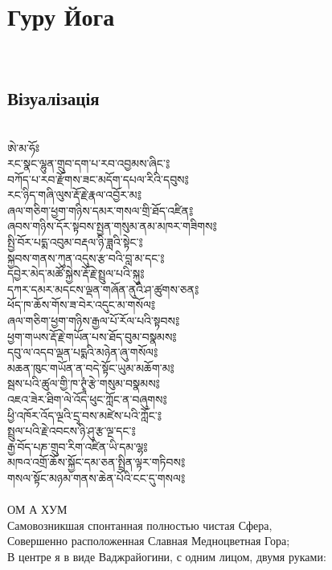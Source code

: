 \section{Гуру Йога}
\\
\subsection{Візуалізація}
\\
\ti
ཨེ་མ་ཧོཿ \\
རང་སྣང་ལྷུན་གྲུབ་དག་པ་རབ་འབྱམས་ཞིང་༔ \\
བཀོད་པ་རབ་རྫོགས་ཟང་མདོག་དཔལ་རིའི་དབུས༔\\
རང་ཉིད་གཞི་ལུས་རྡོ་རྗེ་རྣལ་འབྱོར་མ༔\\
ཞལ་གཅིག་ཕྱག་གཉིས་དམར་གསལ་གྲི་ཐོད་འཛིན༔\\
ཞབས་གཉིས་དོར་སྟབས་སྤྱན་གསུམ་ནམ་མཁར་གཟིགས༔\\
སྤྱི་བོར་པདྨ་འབུམ་བརྡལ་ཉི་ཟླའི་སྟེང་༔\\
སྐྱབས་གནས་ཀུན་འདུས་རྩ་བའི་བླ་མ་དང་༔\\
དབྱེར་མེད་མཚོ་སྐྱེས་རྡོ་རྗེ་སྤྲུལ་པའི་སྐུ༔\\
དཀར་དམར་མདངས་ལྡན་གཞོན་ནུའི་ཤ་ཚུགས་ཅན༔\\
ཕོད་ཁ་ཆོས་གོས་ཟ་བེར་འདུང་མ་གསོལ༔\\
ཞལ་གཅིག་ཕྱག་གཉིས་རྒྱལ་པོ་རོལ་པའི་སྟབས༔\\
ཕྱག་གཡས་རྡོ་རྗེ་གཡོན་པས་ཐོད་བུམ་བསྣམས༔\\
དབུ་ལ་འདབ་ལྡན་པདྨའི་མཉེན་ཞུ་གསོལ༔\\
མཆན་ཁུང་གཡོན་ན་བདེ་སྟོང་ཡུམ་མཆོག་མ༔\\
སྦས་པའི་ཚུལ་གྱི་ཁ་ཊྭཱཾ་རྩེ་གསུམ་བསྣམས༔\\
འཇའ་ཟེར་ཐིག་ལེ་འོད་ཕུང་ཀློང་ན་བཞུགས༔\\
ཕྱི་འཁོར་འོད་ལྔའི་དྲྭ་བས་མཛེས་པའི་ཀློང་༔\\
སྤྲུལ་པའི་རྗེ་འབངས་ཉི་ཤུ་རྩ་ལྔ་དང་༔\\
རྒྱ་བོད་པཎ་གྲུབ་རིག་འཛིན་ཡི་དམ་ལྷ༔\\
མཁའ་འགྲོ་ཆོས་སྐྱོང་དམ་ཅན་སྤྲིན་ལྟར་གཏིབས༔\\
གསལ་སྟོང་མཉམ་གནས་ཆེན་པོའི་ངང་དུ་གསལ༔\\
\ru
\newpage
\\
ОМ А ХУМ\\
Самовозникшая спонтанная полностью чистая Сфера,\\
Совершенно расположенная Славная Медноцветная Гора; \\
В центре я в виде Ваджрайогини, с одним лицом, двумя руками:\\
